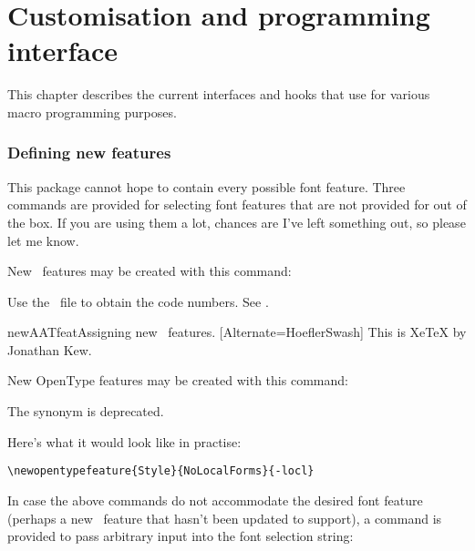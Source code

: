 \documentclass[a4paper]{l3doc}
\begin{document}
\part{Customisation and programming interface}

This chapter describes the current interfaces and hooks that use
 for various macro programming purposes.


\section{Defining new features} \label{sec:newfeatures}
This package cannot hope to contain every possible font
feature. Three commands are provided for selecting font features
that are not provided for out of the box. If you are using
them a lot, chances are I've left something out, so please let me
know.

\DescribeMacro{\newAATfeature}
New \AAT\ features may be created with this command:\par
{\centering\cmd\newAATfeature{}\par}\noindent
Use the \XeTeX\ file  to obtain the code numbers.
See .

\begin{Xexample}{newAATfeat}{Assigning new \AAT\ features.}
  [Alternate=HoeflerSwash]
   This is XeTeX by Jonathan Kew.
\end{Xexample}


\DescribeMacro{\newopentypefeature}
New OpenType features may be created with this command:\par
{\centering\cmd\newopentypefeature{}\par}
The synonym  is deprecated.

Here's what it would look like in practise:
\begin{Verbatim}
\newopentypefeature{Style}{NoLocalForms}{-locl}
\end{Verbatim}

\DescribeMacro{\newfontfeature}
In case the above commands do not accommodate the desired font feature
(perhaps a new \XeTeX\ feature that  hasn't been updated
to support), a command is provided to pass arbitrary input into the
font selection string:\par
{\centering\cmd{\newfontfeature}\par}
\end{document}
